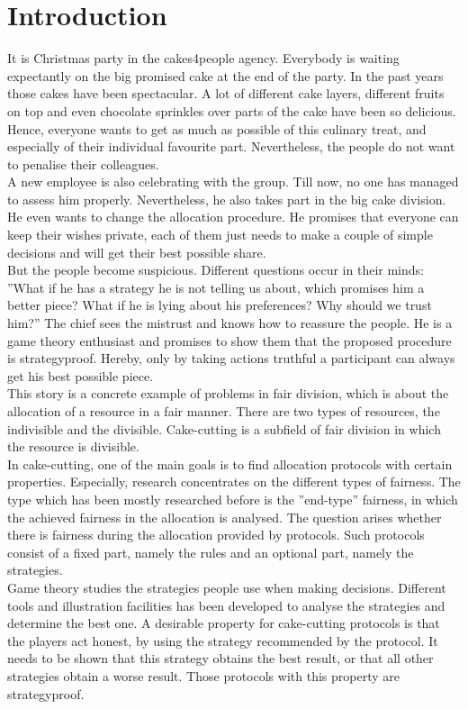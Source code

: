 \section{Introduction}
It is Christmas party in the cakes4people agency. Everybody is waiting expectantly on the big promised cake at the end of the party. In the past years those cakes have been spectacular. A lot of different cake layers, different fruits on top and even chocolate sprinkles over parts of the cake have been so delicious. Hence, everyone wants to get as much as possible of this culinary treat, and especially of their individual favourite part. Nevertheless, the people do not want to penalise their colleagues.\\A new employee is also celebrating with the group. Till now, no one has managed to assess him properly. Nevertheless, he also takes part in the big cake division. He even wants to change the allocation procedure. He promises that everyone can keep their wishes private, each of them just needs to make a couple of simple decisions and will get their best possible share.\\But the people become suspicious. Different questions occur in their minds: ''What if he has a strategy he is not telling us about, which promises him a better piece? What if he is lying about his preferences? Why should we trust him?''
The chief sees the mistrust and knows how to reassure the people. He is a game theory enthusiast and promises to show them that the proposed procedure is strategyproof. Hereby, only by taking actions truthful a participant can always get his best possible piece.\\
\newline
This story is a concrete example of problems in fair division, which is about the allocation of a resource in a fair manner. There are two types of resources, the indivisible and the divisible. Cake-cutting is a subfield of fair division in which the resource is divisible.\\
In cake-cutting, one of the main goals is to find allocation protocols with certain properties. Especially, research concentrates on the different types of fairness. The type which has been mostly researched before is the ''end-type'' fairness, in which the achieved fairness in the allocation is analysed. 
The question arises whether there is fairness during the allocation provided by protocols.
Such protocols consist of a fixed part, namely the rules and an optional part, namely the strategies. \\Game theory studies the strategies people use when making decisions. Different tools and illustration facilities has been developed to analyse the strategies and determine the best one. A desirable property for cake-cutting protocols is that the players act honest, by using the strategy recommended by the protocol. It needs to be shown that this strategy obtains the best result, or that all other strategies obtain a worse result. Those protocols with this property are strategyproof.\\
